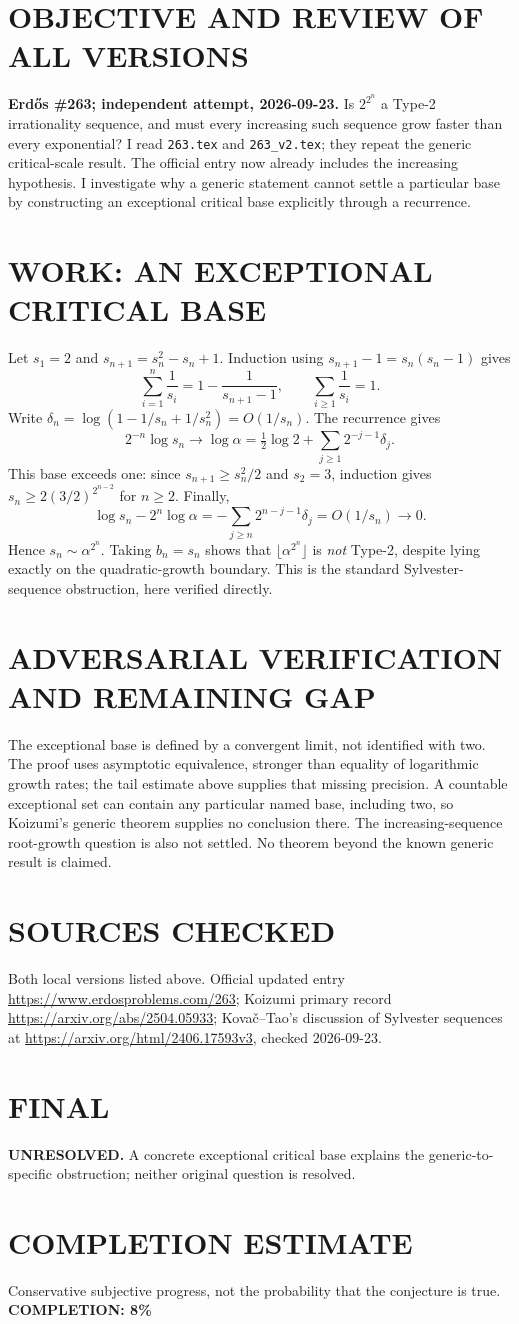 \section{OBJECTIVE AND REVIEW OF ALL VERSIONS}
\textbf{Erd\H{o}s \#263; independent attempt, 2026-09-23.}
Is $2^{2^n}$ a Type-2 irrationality sequence, and must every increasing such sequence grow faster than every exponential? I read \texttt{263.tex} and \texttt{263\_v2.tex}; they repeat the generic critical-scale result. The official entry now already includes the increasing hypothesis. I investigate why a generic statement cannot settle a particular base by constructing an exceptional critical base explicitly through a recurrence.
\section{WORK: AN EXCEPTIONAL CRITICAL BASE}
Let $s_1=2$ and $s_{n+1}=s_n^2-s_n+1$. Induction using $s_{n+1}-1=s_n(s_n-1)$ gives
\[
\sum_{i=1}^n\frac1{s_i}=1-\frac1{s_{n+1}-1},
\qquad \sum_{i\ge1}\frac1{s_i}=1.
\]
Write $\delta_n=\log(1-1/s_n+1/s_n^2)=O(1/s_n)$. The recurrence gives
\[
2^{-n}\log s_n\longrightarrow\log\alpha
=\tfrac12\log2+\sum_{j\ge1}2^{-j-1}\delta_j.
\]
This base exceeds one: since $s_{n+1}\ge s_n^2/2$ and $s_2=3$, induction gives $s_n\ge2(3/2)^{2^{n-2}}$ for $n\ge2$. Finally,
\[
\log s_n-2^n\log\alpha
=-\sum_{j\ge n}2^{n-j-1}\delta_j=O(1/s_n)\to0.
\]
Hence $s_n\sim\alpha^{2^n}$. Taking $b_n=s_n$ shows that $\lfloor\alpha^{2^n}\rfloor$ is \emph{not} Type-2, despite lying exactly on the quadratic-growth boundary. This is the standard Sylvester-sequence obstruction, here verified directly.
\section{ADVERSARIAL VERIFICATION AND REMAINING GAP}
The exceptional base is defined by a convergent limit, not identified with two. The proof uses asymptotic equivalence, stronger than equality of logarithmic growth rates; the tail estimate above supplies that missing precision. A countable exceptional set can contain any particular named base, including two, so Koizumi's generic theorem supplies no conclusion there. The increasing-sequence root-growth question is also not settled. No theorem beyond the known generic result is claimed.
\section{SOURCES CHECKED}
Both local versions listed above. Official updated entry \url{https://www.erdosproblems.com/263}; Koizumi primary record \url{https://arxiv.org/abs/2504.05933}; Kova\v c--Tao's discussion of Sylvester sequences at \url{https://arxiv.org/html/2406.17593v3}, checked 2026-09-23.
\section{FINAL}
\textbf{UNRESOLVED.} A concrete exceptional critical base explains the generic-to-specific obstruction; neither original question is resolved.
\section{COMPLETION ESTIMATE}
Conservative subjective progress, not the probability that the conjecture is true.
\textbf{COMPLETION: 8\%}

